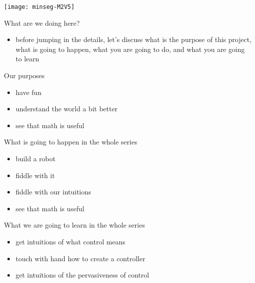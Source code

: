 \begin{frame}
	\titlepage
	\begin{center}
		\texttt{[image: minseg-M2V5]}
	\end{center}
\end{frame}


\begin{frame}{What are we doing here?}
	\begin{itemize}
		\item before jumping in the details, let's discuss what is the purpose of this project, what is going to happen, what you are going to do, and what you are going to learn
	\end{itemize}
\end{frame}


\begin{frame}{Our purposes}
	\pause
	\begin{itemize}
		\item have fun
		\pause
		\item understand the world a bit better
		\pause
		\item see that math is useful
	\end{itemize}
\end{frame}


\begin{frame}{What is going to happen in the whole series}
	\pause
	\begin{itemize}
		\item build a robot
		\pause
		\item fiddle with it
		\pause
		\item fiddle with our intuitions
		\pause
		\item see that math is useful
	\end{itemize}
\end{frame}


\begin{frame}{What we are going to learn in the whole series}
	\pause
	\begin{itemize}
		\item get intuitions of what control means
		\pause
		\item touch with hand how to create a controller 
		\pause
		\item get intuitions of the pervasiveness of control
	\end{itemize}
\end{frame}


